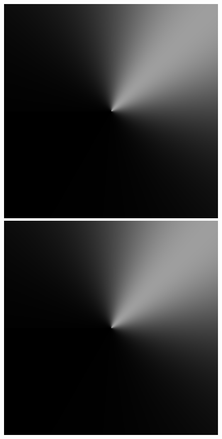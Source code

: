 \begin{figure}
{ }
 \hfill
 \subtop
 {
 \includegraphics[scale=0.115]{figures/donelan_dfilt_wur_sqrt50.png}
 }
 \hfill
 \subtop
 {
 \includegraphics[scale=0.115]{figures/donelan_dfilt_wur_sqrt200.png}
}
\end{figure}
